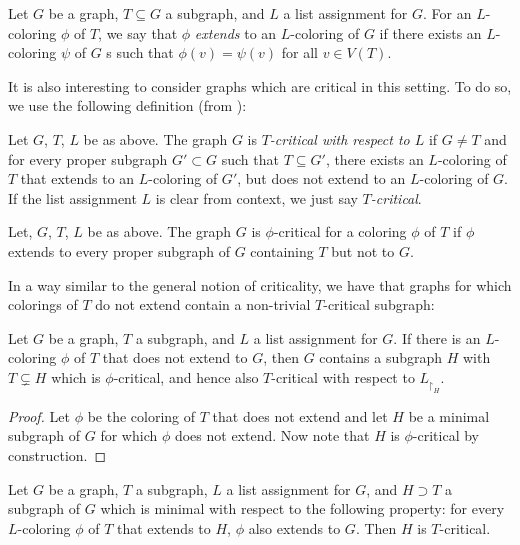 \begin{definition}[Extending]
	Let $G$ be a graph, $T \subseteq G$ a subgraph, and $L$ a list assignment
	for $G$. For an $L$-coloring $\phi$ of $T$, we say that $\phi$ \emph{extends}
	to an $L$-coloring of $G$ if there exists an $L$-coloring $\psi$ of $G$
s	such that $\phi(v) = \psi(v)$ for all $v \in V(T)$. 
	
\end{definition}

It is also interesting to consider graphs which are critical in this setting. To do so, we use the following definition (from \cite{fivelistcoloring2}):

\begin{definition}[$T$-critical]
	Let $G$, $T$, $L$ be as above. The graph $G$ is \emph{$T$-critical with respect to $L$} if $G \neq T$ and for every proper subgraph $G' \subset G$ such that $T \subseteq G'$, there exists an $L$-coloring of $T$ that extends to an $L$-coloring of $G'$, but does not extend to an $L$-coloring of $G$. If the list assignment $L$ is clear from context, we just say \emph{$T$-critical}.
\end{definition}

\begin{definition}
	Let, $G$, $T$, $L$ be as above. The graph $G$ is $\phi$-critical for a coloring $\phi$ of $T$ if $\phi$ extends to every proper subgraph of $G$ containing $T$ but not to $G$.
\end{definition}

In a way similar to the general notion of criticality, we have that graphs for which colorings of $T$ do not extend contain a non-trivial $T$-critical subgraph:

\begin{lemma}
Let $G$ be a graph, $T$ a subgraph, and $L$ a list assignment for $G$. If there 
is an $L$-coloring $\phi$ of $T$ that does not extend to $G$, 
then $G$ contains a subgraph $H$ with $T \subsetneq H$ which 
is $\phi$-critical, and hence also $T$-critical with respect 
to $L_{\restriction_H}$. 
\end{lemma}

\begin{proof}
Let $\phi$ be the coloring of $T$ that does not extend and let $H$ be a minimal subgraph 
of $G$ for which $\phi$ does not extend. Now note that $H$ is $\phi$-critical 
by construction.
\end{proof}

\begin{lemma}
\label{minimalsubgraphlemma}
Let $G$ be a graph, $T$ a subgraph, $L$ a list assignment for $G$, and $H \supset T$ 
a subgraph of $G$ which is minimal with respect to the following property: 
for every $L$-coloring $\phi$ of $T$ that extends to $H$, $\phi$ also extends to $G$. 
Then $H$ is $T$-critical.
\end{lemma}

